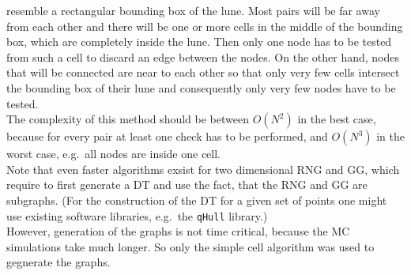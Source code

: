         resemble a rectangular bounding box of the lune. Most pairs will be
        far away from each other and there will be one or more cells in the
        middle of the bounding box, which are completely inside the lune.
        Then only one node has to be tested from such a cell to discard an
        edge between the nodes. On the other hand, nodes that will be connected
        are near to each other so that only very few cells intersect the bounding
        box of their lune and consequently only very few nodes have to be tested.\\
        The complexity of this method should be between \(O(N^2)\) in the
        best case, because for every pair at least one check has to be performed,
        and \(O(N^3)\) in the worst case, e.g.\ all nodes are inside one
        cell.\\
        Note that even faster algorithms exsist for two dimensional RNG and GG, which require to first
        generate a DT and use the fact, that the RNG and GG are subgraphs.
        (For the construction of the DT for a given set of points one might
        use existing software libraries, e.g.\ the \texttt{qHull}\cite{qhull} library.)\\
        However, generation of the graphs is not time critical, because
        the MC simulations take much longer. So only the simple cell algorithm
        was used to gegnerate the graphs.\\
